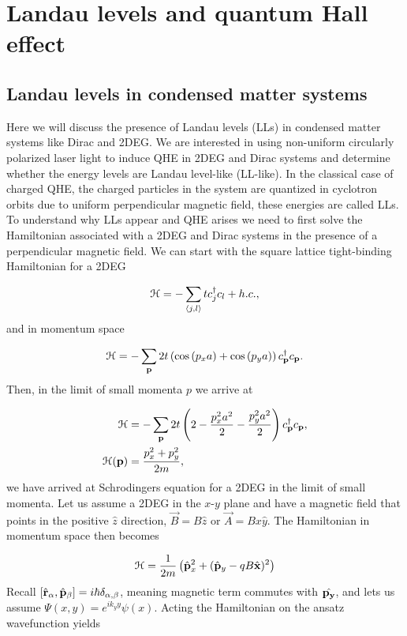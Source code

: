 \section{Landau levels and quantum Hall effect}

\subsection{Landau levels in condensed matter systems}
Here we will discuss the presence of Landau levels (LLs) in condensed matter systems like Dirac and 2DEG.
We are interested in using non-uniform circularly polarized laser light to induce QHE in 2DEG and Dirac systems and determine whether the energy levels are Landau level-like (LL-like).
In the classical case of charged QHE, the charged particles in the system are quantized in cyclotron orbits due to uniform perpendicular magnetic field, these energies are called LLs.
To understand why LLs appear and QHE arises we need to first solve the Hamiltonian associated with a 2DEG and Dirac systems in the presence of a perpendicular magnetic field.
We can start with the square lattice tight-binding Hamiltonian for a 2DEG

\begin{equation}
  \mathcal{H} = -\sum_{\langle j,l \rangle} tc^{\dagger}_j c_{l} + h.c.,
\end{equation}
and in momentum space

\begin{equation}
  \mathcal{H} = -\sum_{\mathbf{p}} 2t \left( \cos{(p_x a)} + \cos{(p_y a)} \right) c^{\dagger}_{\mathbf{p}} c_{\mathbf{p}}.
\end{equation}
Then, in the limit of small momenta $p$ we arrive at

\begin{align}
  \mathcal{H} &= -\sum_{\mathbf{p}} 2t \left( 2 - \dfrac{p_x^2a^2}{2} -\dfrac{p_y^2a^2}{2} \right) c^{\dagger}_{\mathbf{p}} c_{\mathbf{p}}, \nonumber \\
  \mathcal{H}(\mathbf{p}) &= \dfrac{p_x^2 + p_y^2}{2m},
\end{align}
we have arrived at Schrodingers equation for a 2DEG in the limit of small momenta.
Let us assume a 2DEG in the $x$-$y$ plane and have a magnetic field that points in the positive $\hat{z}$ direction, $\vec{B} = B\hat{z}$ or $\vec{A} = Bx\hat{y}$.
The Hamiltonian in momentum space then becomes

\begin{equation}
  \ham = \dfrac{1}{2m} \left( \op{p}_x^2 + (\op{p}_y - qB \op{x})^2 \right)
\end{equation}
Recall $[\op{r}_{\alpha}, \op{p}_{\beta}] = i\hbar \delta_{\alpha,\beta}$, meaning magnetic term commutes with $\op{p_y}$, and lets us assume $\Psi(x,y) = e^{ik_y y} \psi(x)$.
Acting the Hamiltonian on the ansatz wavefunction yields

